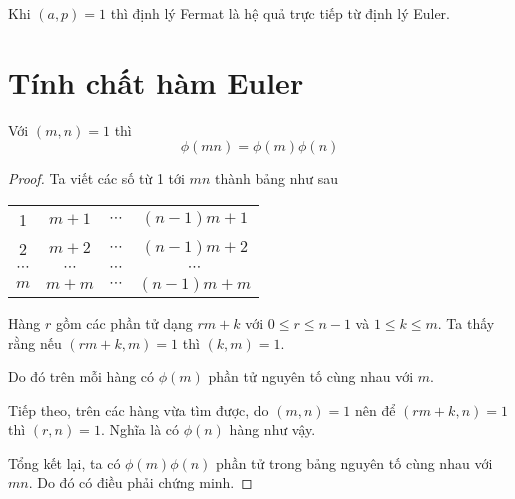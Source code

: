 \begin{remark}
    Khi $(a, p) = 1$ thì định lý Fermat là hệ quả trực tiếp từ định lý Euler.
\end{remark}

\section{Tính chất hàm Euler}

\begin{remark}
    Với $(m, n) = 1$ thì $$\phi(m n) = \phi(m) \phi(n)$$
\end{remark}

\begin{proof}
    Ta viết các số từ 1 tới $mn$ thành bảng như sau

    \begin{center}
        \begin{tabular}{c c c c}
            1 & $m+1$ & $\cdots$ & $(n-1)m + 1$ \\
            2 & $m+2$ & $\cdots$ & $(n-1)m + 2$ \\
            $\cdots$ & $\cdots$ & $\cdots$ & $\cdots$ \\
            $m$ & $m+m$ & $\cdots$ & $(n-1)m + m$
        \end{tabular}
    \end{center}
    
    Hàng $r$ gồm các phần tử dạng $r m + k$ với $0 \leq r \leq n-1$ và $1 \leq k \leq m$. 
    Ta thấy rằng nếu $(rm + k, m) = 1$ thì $(k, m) = 1$.

    Do đó trên mỗi hàng có $\phi(m)$ phần tử nguyên tố cùng nhau với $m$.

    Tiếp theo, trên các hàng vừa tìm được, do $(m, n) = 1$ nên để $(rm + k, n) = 1$ thì $(r, n) = 1$.
    Nghĩa là có $\phi(n)$ hàng như vậy.

    Tổng kết lại, ta có $\phi(m) \phi(n)$ phần tử trong bảng nguyên tố cùng nhau với $mn$. Do đó có điều phải chứng minh.
\end{proof}

\newpage